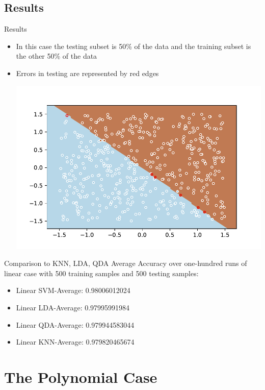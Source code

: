 \documentclass{beamer}
\begin{document}
\subsection{Results}
\begin{frame}{Results}
\begin{itemize}
\item In this case the testing subset is 50\% of the data and the training subset is the other 50\% of the data
\item Errors in testing are represented by red edges
\begin{center}
\includegraphics[scale=.6]{linearcase.pdf}
\end{center}
\end{itemize}
\end{frame}

\begin{frame}{Comparison to KNN, LDA, QDA}
Average Accuracy over one-hundred runs of linear case with 500 training samples and 500 testing samples:
\begin{itemize}
\item Linear SVM-Average: 0.98006012024
\item Linear LDA-Average: 0.97995991984
\item Linear QDA-Average: 0.979944583044
\item Linear KNN-Average: 0.979820465674
\end{itemize}
\end{frame}

\section{The Polynomial Case}
\end{document}
